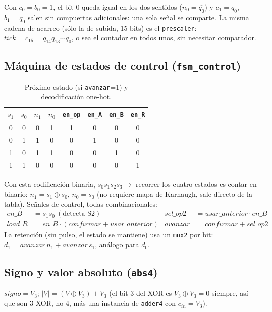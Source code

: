 \documentclass[11pt,a4paper]{article}
\newcommand{\sig}[1]{\texttt{#1}}
\newcommand{\nott}[1]{\overline{#1}}
\begin{document}
Con $c_0=b_0=1$, el bit 0 queda igual en los dos sentidos ($n_0=\nott{q_0}$) y $c_1=q_0$, $b_1=\nott{q_0}$ salen sin compuertas adicionales: una sola señal se comparte. La misma cadena de acarreo (sólo la de subida, 15 bits) es el \sig{prescaler}: $\mathit{tick}=c_{15}=q_{14}q_{13}\cdots q_0$, o sea el contador en todos unos, sin necesitar comparador.

\subsection{Máquina de estados de control (\sig{fsm\_control})}

\begin{table}[H]
\centering
\begin{tabular}{@{}cc|cc|cccc@{}}
\toprule
$s_1$&$s_0$ & $n_1$&$n_0$ & \sig{en\_op}&\sig{en\_A}&\sig{en\_B}&\sig{en\_R}\\
\midrule
0&0 & 0&1 & 1&0&0&0\\
0&1 & 1&0 & 0&1&0&0\\
1&0 & 1&1 & 0&0&1&0\\
1&1 & 0&0 & 0&0&0&1\\
\bottomrule
\end{tabular}
\caption{Próximo estado (si \sig{avanzar}=1) y decodificación one-hot.}
\end{table}

Con esta codificación binaria, $s_0s_1s_2s_3\to$ recorrer los cuatro estados es contar en binario: $n_1=s_1\oplus s_0$, $n_0=\nott{s_0}$ (no requiere mapa de Karnaugh, sale directo de la tabla). Señales de control, todas combinacionales:
\[
\begin{aligned}
\mathit{en\_B} &= s_1\nott{s_0} \ (\text{detecta S2}) &
\mathit{sel\_op2} &= \mathit{usar\_anterior}\cdot\mathit{en\_B} \\
\mathit{load\_R} &= \mathit{en\_B}\cdot(\mathit{confirmar}+\mathit{usar\_anterior}) &
\mathit{avanzar} &= \mathit{confirmar}+\mathit{sel\_op2}
\end{aligned}
\]
La retención (sin pulso, el estado se mantiene) usa un \sig{mux2} por bit: $d_1=\mathit{avanzar}\,n_1+\nott{\mathit{avanzar}}\,s_1$, análogo para $d_0$.

\subsection{Signo y valor absoluto (\sig{abs4})}

$\mathit{signo}=V_3$; $|V|=(V\oplus V_3)+V_3$ (el bit 3 del XOR es $V_3\oplus V_3=0$ siempre, así que son 3 XOR, no 4, más una instancia de \sig{adder4} con $c_{in}=V_3$).
\end{document}
